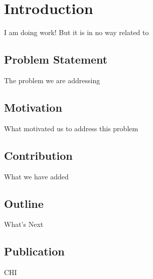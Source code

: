 \chapter{Introduction}

I am doing work! But it is in no way related to \cite{Rogers}

\section{Problem Statement}

The problem we are addressing 

\section{Motivation}

What motivated us to address this problem

\section{Contribution}

What we have added

\section{Outline}

What's Next

\section{Publication}

CHI